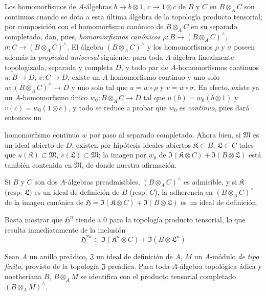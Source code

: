 \begin{env}[7.7.6]
\label{0.7.7.6-fr}
Los homomorfismos de $A$-álgebras $b\to b\otimes 1$,
$c\to 1\otimes c$ de $B$ y $C$ en $B\otimes_A C$ son continuos
cuando se dota a esta última álgebra de la topología producto tensorial;
por composición con el homomorfismo canónico de $B\otimes_A C$ en su
separado completado, dan, pues, \emph{homomorfismos canónicos}
$\rho:B\to(B\otimes_A C)^\wedge$, $\sigma:C\to(B\otimes_A C)^\wedge$.
El álgebra $(B\otimes_A C)^\wedge$ y los homomorfismos $\rho$ y $\sigma$
poseen además la \emph{propiedad universal} siguiente: para toda
$A$-álgebra linealmente topologizada, separada y completa $D$, y todo
par de $A$-homomorfismos continuos $u:B\to D$, $v:C\to D$, existe un
$A$-homomorfismo continuo y uno solo
$w:(B\otimes_A C)^\wedge\to D$ y uno solo tal que $u=w\circ\rho$ y
$v=w\circ\sigma$. En efecto, existe ya un $A$-homomorfismo único
$w_0:B\otimes_A C\to D$ tal que $u(b)=w_0(b\otimes 1)$ y
$v(c)=w_0(1\otimes c)$, y todo se reduce a probar que $w_0$ es \emph{continuo},
pues dará entonces un


homomorfismo continuo $w$ por paso al separado completado. Ahora bien, si
$\mathfrak M$ es un ideal abierto de $D$, existen por hipótesis ideales
abiertos $\mathfrak K\subset B$, $\mathfrak L\subset C$ tales que
$u(\mathfrak K)\subset\mathfrak M$, $v(\mathfrak L)\subset\mathfrak M$;
la imagen por $w_0$ de
$\Im(\mathfrak K\otimes C)+\Im(B\otimes\mathfrak L)$ está también
contenida en $\mathfrak M$, de donde nuestra afirmación.
\end{env}

\begin{proposition}[7.7.7]
\label{0.7.7.7-fr}
Si $B$ y $C$ son dos $A$-álgebras preadmisibles,
$(B\otimes_A C)^\wedge$ es admisible, y si $\mathfrak K$ \textup{(resp.
$\mathfrak L$)} es un ideal de definición de $B$ \textup{(resp. $C$)}, la adherencia
en $(B\otimes_A C)^\wedge$ de la imagen canónica de
$\mathfrak H=\Im(\mathfrak K\otimes C)+\Im(B\otimes\mathfrak L)$ es
un ideal de definición.
\end{proposition}

Basta mostrar que $\mathfrak H^n$ tiende a $0$ para la topología
producto tensorial, lo que resulta inmediatamente de la inclusión
\[
  \mathfrak H^{2n}\subset
  \Im(\mathfrak K^n\otimes C)+\Im(B\otimes\mathfrak L^n)
\]

\begin{proposition}[7.7.8]
\label{0.7.7.8-fr}
Sean $A$ un anillo preádico, $\mathfrak J$ un ideal de definición de
$A$, $M$ un $A$-módulo \emph{de tipo finito}, provisto de la topología
$\mathfrak J$-preádica. Para toda $A$-álgebra topológica ádica y
noetheriana $B$, $B\otimes_A M$ se identifica con el producto tensorial completado
$(B\otimes_A M)^\wedge$.
\end{proposition}


